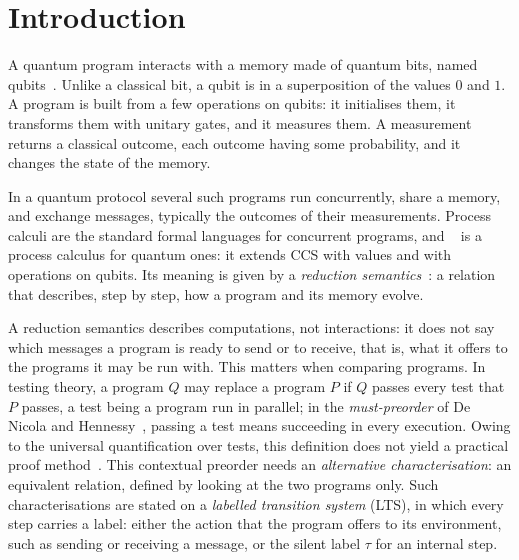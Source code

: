 \section{Introduction}\label{sec:intro}

A quantum program interacts with a memory made of quantum bits,
named qubits~\cite{Knill96,FLV25,CHPV26}. Unlike a
classical bit, a qubit is in a superposition of the values $0$ and $1$.
A program is built from a few operations on qubits: it initialises them, it
transforms them with unitary gates, and it measures them. A measurement
returns a classical outcome, each outcome having some probability, and it
changes the state of the memory.

In a quantum protocol several such programs run concurrently, share a
memory, and exchange messages, typically the outcomes of their measurements.
Process calculi are the standard formal languages for concurrent programs,
and \lqCCS{}~\cite{Ceragioli24popl} is a process calculus for quantum ones: it
extends CCS with values and with operations on qubits. Its meaning is
given by a \emph{reduction semantics}~\cite{SangiorgiWalker01}: a relation
that describes, step by step, how a program and its memory evolve.

A reduction semantics describes computations, not interactions: it does not
say which messages a program is ready to send or to receive, that is, what
it offers to the programs it may be run with. This matters when comparing
programs. In testing theory, a program $Q$ may replace
a program $P$ if $Q$ passes every test that $P$ passes, a test being a
program run in parallel; in the
\emph{must-preorder} of De Nicola and Hennessy~\cite{DNH84}, passing a test
means succeeding in every execution. Owing to the universal quantification
over tests, this definition does not yield a practical proof
method~\cite{BCLS25}. This contextual preorder needs an \emph{alternative
characterisation}: an equivalent relation, defined by looking at the two
programs only. Such characterisations are stated on a \emph{labelled
transition system} (LTS), in which every step carries a label: either the
action that the program offers to its environment, such as sending or
receiving a message, or the silent label $\tau$ for an internal step.

